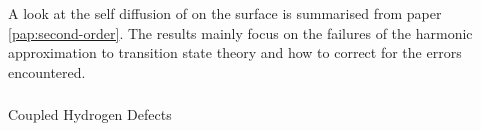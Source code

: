 \subsubsection{}
A look at the self diffusion of  on the  surface is summarised from paper \ref{pap:second-order}.
The results mainly focus on the failures of the harmonic approximation to transition state theory and how to correct for the errors encountered.

\subsubsection{}
Coupled Hydrogen Defects \expand

